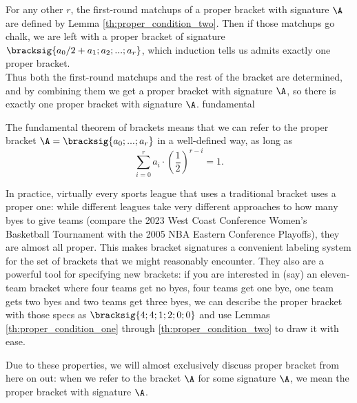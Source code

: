 {{        For any other $r$, the first-round matchups of a proper bracket with signature $\A$ are defined by Lemma \ref{th:proper_condition_two}. Then if those matchups go chalk, we are left with a proper bracket of signature $\bracksig{a_0/2 + a_1; a_2; ...; a_r}$, which induction tells us admits exactly one proper bracket.\\

        Thus both the first-round matchups and the rest of the bracket are determined, and by combining them we get a proper bracket with signature $\A$, so there is exactly one proper bracket with signature $\A$.
    }{fundamental}{\fried}

    \pagebreak

    The fundamental theorem of brackets means that we can refer to the proper bracket $\A = \bracksig{a_0; ...; a_r}$ in a well-defined way, as long as $$\sum_{i=0}^r a_i \cdot \left(\frac{1}{2}\right)^{r - i} = 1.$$

    In practice, virtually every sports league that uses a traditional bracket uses a proper one: while different leagues take very different approaches to how many byes to give teams (compare the 2023 West Coast Conference Women's Basketball Tournament with the 2005 NBA Eastern Conference Playoffs), they are almost all proper. This makes bracket signatures a convenient labeling system for the set of brackets that we might reasonably encounter. They also are a powerful tool for specifying new brackets: if you are interested in (say) an eleven-team bracket where four teams get no byes, four teams get one bye, one team gets two byes and two teams get three byes, we can describe the proper bracket with those specs as $\bracksig{4; 4; 1; 2; 0; 0}$ and use Lemmas \ref{th:proper_condition_one} through \ref{th:proper_condition_two} to draw it with ease.


    Due to these properties, we will almost exclusively discuss proper bracket from here on out: when we refer to the bracket $\A$ for some signature $\A$, we mean the proper bracket with signature $\A$.
}